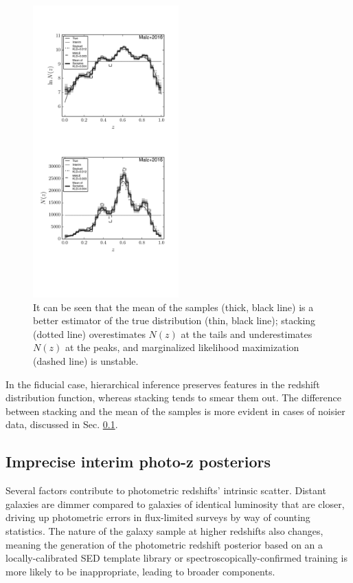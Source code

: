 \documentclass[preprint]{aastex}
\begin{document}
\begin{figure}
\includegraphics[width=0.5\textwidth]{figs/null/comps.pdf}
\caption{It can be seen that the mean of the samples (thick, black line) is a 
better estimator of the true distribution (thin, black line); stacking (dotted 
line) overestimates $N(z)$ at the tails and underestimates $N(z)$ at the peaks, 
and marginalized likelihood maximization (dashed line) is unstable.}
\label{fig:null-comp}
\end{figure}

In the fiducial case, hierarchical inference preserves features in the redshift 
distribution function, whereas stacking tends to smear them out.  The 
difference between stacking and the mean of the samples is more evident in 
cases of noisier data, discussed in Sec. \ref{sec:noisy}.

\subsection{Imprecise interim photo-z posteriors}
\label{sec:noisy}

Several factors contribute to photometric redshifts' intrinsic scatter.  
Distant galaxies are dimmer compared to galaxies of identical luminosity that 
are closer, driving up photometric errors in flux-limited surveys by way of 
counting statistics.  The nature of the galaxy sample at higher redshifts also 
changes, meaning the generation of the photometric redshift posterior based on 
an a locally-calibrated SED template library or spectroscopically-confirmed 
training is more likely to be inappropriate, leading to broader components.
\end{document}
